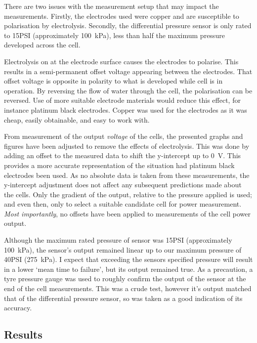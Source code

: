       There are two issues with the measurement setup that may impact the measurements.
      Firstly, the electrodes used were copper and are susceptible to polarisation by electrolysis.
      Secondly, the differential pressure sensor is only rated to 15\thinspace PSI (approximately \SI{100}{\kilo\pascal}), less than half the maximum pressure developed across the cell.

      Electrolysis on at the electrode surface causes the electrodes to polarise.
      This results in a semi-permanent offset voltage appearing between the electrodes.
      That offset voltage is opposite in polarity to what is developed while cell is in operation.
      By reversing the flow of water through the cell, the polarisation can be reversed.
      Use of more suitable electrode materials would reduce this effect, for instance platinum black electrodes.
      Copper was used for the electrodes as it was cheap, easily obtainable, and easy to work with.

      From measurement of the output \emph{voltage} of the cells, the presented graphs and figures have been adjusted to remove the effects of electrolysis.
      This was done by adding an offset to the measured data to shift the y-intercept up to \SI{0}{\volt}.
      This provides a more accurate representation of the situation had platinum black electrodes been used.
      As no absolute data is taken from these measurements, the y-intercept adjustment does not affect any subsequent predictions made about the cells.
      Only the gradient of the output, relative to the pressure applied is used; and even then, only to select a suitable candidate cell for power measurement.
      \emph{Most importantly}, no offsets have been applied to measurements of the cell power output.

      Although the maximum rated pressure of sensor was 15\thinspace PSI (approximately \SI{100}{\kilo\pascal}), the sensor's output remained linear up to our maximum pressure of 40\thinspace PSI (\SI{275}{\kilo\pascal}).
      I expect that exceeding the sensors specified pressure will result in a lower `mean time to failure', but its output remained true.
      As a precaution, a tyre pressure gauge was used to roughly confirm the output of the sensor at the end of the cell measurements.
      This was a crude test, however it's output matched that of the differential pressure sensor, so was taken as a good indication of its accuracy.


  \subsection{Results}


